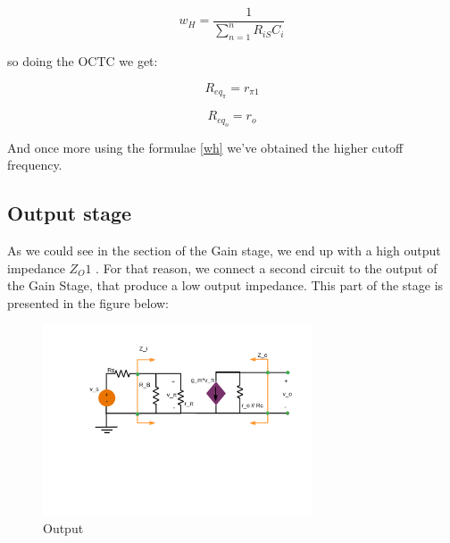 \begin{equation}
w_H = \frac{1}{\sum_{n = 1}^n R_{iS}C_i}
\label{wh}
\end{equation} 

so doing the OCTC we get:

\begin{equation}
R_{eq_{\pi}} = r_{\pi 1}
\end{equation} 

\begin{equation}
R_{eq_{o}} = r_{o}
\end{equation} 

And once more using the formulae \ref{wh} we've obtained the higher cutoff frequency.

\subsection{Output stage}

As we could see in the section of the Gain stage, we end up with a high output impedance $Z_O1$ . For that reason, we
connect a second circuit to the output of the Gain Stage, that produce a low output impedance.
This part of the stage is presented in the figure below:

\begin{figure}[H] 
\centering
\includegraphics[width = 8cm]{Incremental_Gain.pdf} 
\caption{Output}
\label{output}
\end{figure}

